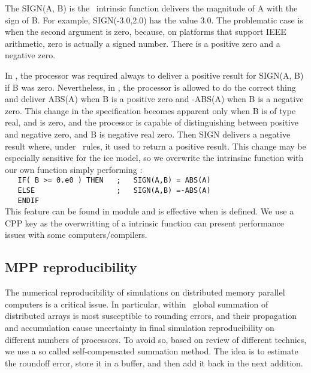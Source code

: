 \documentclass[../main/NEMO_manual]{subfiles}
\begin{document}
The SIGN(A, B) is the \fortran\ intrinsic function delivers the magnitude of A with the sign of B.
For example, SIGN(-3.0,2.0) has the value 3.0.
The problematic case is when the second argument is zero, because, on platforms that support IEEE arithmetic,
zero is actually a signed number.
There is a positive zero and a negative zero.

In \fninety, the processor was required always to deliver a positive result for SIGN(A, B) if B was zero.
Nevertheless, in \fninety, the processor is allowed to do the correct thing and deliver ABS(A) when
B is a positive zero and -ABS(A) when B is a negative zero.
This change in the specification becomes apparent only when B is of type real, and is zero,
and the processor is capable of distinguishing between positive and negative zero,
and B is negative real zero.
Then SIGN delivers a negative result where, under \fninety\ rules, it used to return a positive result.
This change may be especially sensitive for the ice model,
so we overwrite the intrinsinc function with our own function simply performing :   \\
\verb?   IF( B >= 0.e0 ) THEN   ;   SIGN(A,B) = ABS(A)  ?    \\
\verb?   ELSE                   ;   SIGN(A,B) =-ABS(A)     ?  \\
\verb?   ENDIF    ? \\
This feature can be found in  module and is effective when  is defined.
We use a CPP key as the overwritting of a intrinsic function can present performance issues with
some computers/compilers.

\subsection{MPP reproducibility}
\label{subsec:MISC_glosum}

The numerical reproducibility of simulations on distributed memory parallel computers is a critical issue.
In particular, within \NEMO\ global summation of distributed arrays is most susceptible to rounding errors,
and their propagation and accumulation cause uncertainty in final simulation reproducibility on
different numbers of processors.
To avoid so, based on \citet{he.ding_JS01} review of different technics,
we use a so called self-compensated summation method.
The idea is to estimate the roundoff error, store it in a buffer, and then add it back in the next addition.
\end{document}
